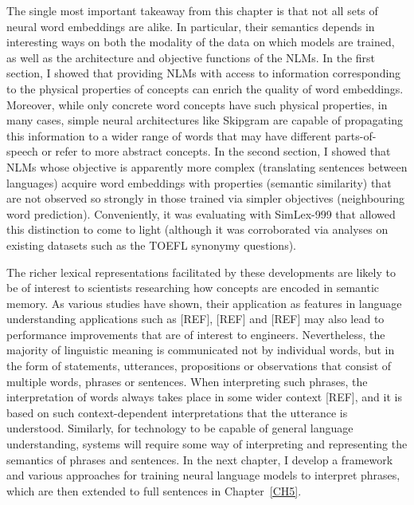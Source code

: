 The single most important takeaway from this chapter is that not all sets of neural word embeddings are alike. In particular, their semantics depends in interesting ways on both the modality of the data on which models are trained, as well as the architecture and objective functions of the NLMs. In the first section, I showed that providing NLMs with access to information corresponding to the physical properties of concepts can enrich the quality of word embeddings. Moreover, while only concrete word concepts have such physical properties, in many cases, simple neural architectures like Skipgram are capable of propagating this information to a wider range of words that may have different parts-of-speech or refer to more abstract concepts. In the second section, I showed that NLMs whose objective is apparently more complex (translating sentences between languages) acquire word embeddings with properties (semantic similarity) that are not observed so strongly in those trained via simpler objectives (neighbouring word prediction). Conveniently, it was evaluating with SimLex-999 that allowed this distinction to come to light (although it was corroborated via analyses on existing datasets such as the TOEFL synonymy questions). 

The richer lexical representations facilitated by these developments are likely to be of interest to scientists researching how concepts are encoded in semantic memory. As various studies have shown, their application as features in language understanding applications such as [REF], [REF] and [REF] may also lead to performance improvements that are of interest to engineers. Nevertheless, the majority of linguistic meaning is communicated not by individual words, but in the form of statements, utterances, propositions or observations that consist of multiple words, phrases or sentences. When interpreting such phrases, the interpretation of words always takes place in some wider context [REF], and it is based on such context-dependent interpretations that the utterance is understood. Similarly, for technology to be  capable of general language understanding, systems will require some way of interpreting and representing the semantics of phrases and sentences. In the next chapter, I develop a framework and various approaches for training neural language models to interpret phrases, which are then extended to full sentences in Chapter~\ref{CH5}. 


